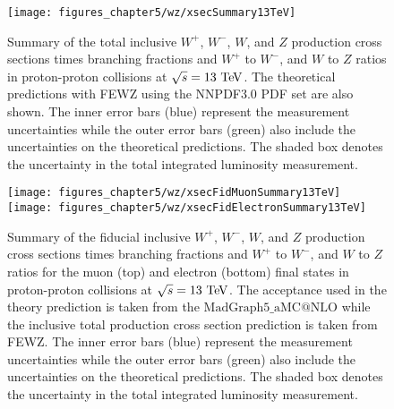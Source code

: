 \begin{figure}[htbp]
\centering
\texttt{[image: figures\_chapter5/wz/xsecSummary13TeV]}
\caption{Summary of the total inclusive $W^+$, $W^-$, $W$, and $Z$ production cross sections times branching fractions and $W^+$ to $W^-$, and $W$ to $Z$ ratios in proton-proton collisions at $\sqrt{s}=13~\mathrm{Te\kern -0.1em V}$. The theoretical predictions with FEWZ using the NNPDF3.0 PDF set are also shown. The inner error bars (blue) represent the measurement uncertainties while the outer error bars (green) also include the uncertainties on the theoretical predictions. The shaded box denotes the uncertainty in the total integrated luminosity measurement.}
\label{fig:13tev}
\end{figure}
\begin{figure}[htbp]
\centering
\texttt{[image: figures\_chapter5/wz/xsecFidMuonSummary13TeV]}
\texttt{[image: figures\_chapter5/wz/xsecFidElectronSummary13TeV]}
\caption{Summary of the fiducial inclusive $W^+$, $W^-$, $W$, and $Z$ production cross sections times branching fractions and $W^+$ to $W^-$, and $W$ to $Z$ ratios for the muon (top) and electron (bottom) final states in proton-proton collisions at $\sqrt{s}=13~\mathrm{Te\kern -0.1em V}$. The acceptance used in the theory prediction is taken from the $\mathrm{MadGraph5}\_\mathrm{aMC@NLO}$ while the inclusive total production cross section prediction is taken from FEWZ. The inner error bars (blue) represent the measurement uncertainties while the outer error bars (green) also include the uncertainties on the theoretical predictions. The shaded box denotes the uncertainty in the total integrated luminosity measurement.}
\label{fig:fid}
\end{figure}

